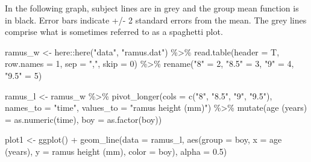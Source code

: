 \documentclass[
  9pt,
  ignorenonframetext,
]{beamer}
\newenvironment{Shaded}{\begin{snugshade}}{\end{snugshade}}
\newcommand{\AttributeTok}[1]{\textcolor[rgb]{0.77,0.63,0.00}{#1}}
\newcommand{\DecValTok}[1]{\textcolor[rgb]{0.00,0.00,0.81}{#1}}
\newcommand{\FloatTok}[1]{\textcolor[rgb]{0.00,0.00,0.81}{#1}}
\newcommand{\FunctionTok}[1]{\textcolor[rgb]{0.00,0.00,0.00}{#1}}
\newcommand{\NormalTok}[1]{#1}
\newcommand{\OtherTok}[1]{\textcolor[rgb]{0.56,0.35,0.01}{#1}}
\newcommand{\SpecialCharTok}[1]{\textcolor[rgb]{0.00,0.00,0.00}{#1}}
\newcommand{\StringTok}[1]{\textcolor[rgb]{0.31,0.60,0.02}{#1}}
\begin{document}
\begin{frame}[fragile]{}
\protect\hypertarget{section-1}{}
In the following graph, subject lines are in grey and the group mean
function is in black. Error bars indicate +/- 2 standard errors from the
mean. The grey lines comprise what is sometimes referred to as a
spaghetti plot.

\tiny

\begin{Shaded}
\begin{Highlighting}[]
\NormalTok{ramus\_w }\OtherTok{\textless{}{-}}\NormalTok{ here}\SpecialCharTok{::}\FunctionTok{here}\NormalTok{(}\StringTok{"data"}\NormalTok{, }\StringTok{"ramus.dat"}\NormalTok{) }\SpecialCharTok{\%\textgreater{}\%}
  \FunctionTok{read.table}\NormalTok{(}\AttributeTok{header =}\NormalTok{ T, }\AttributeTok{row.names =} \DecValTok{1}\NormalTok{,}
             \AttributeTok{sep =} \StringTok{","}\NormalTok{,  }\AttributeTok{skip =} \DecValTok{0}\NormalTok{) }\SpecialCharTok{\%\textgreater{}\%}
  \FunctionTok{rename}\NormalTok{(}\StringTok{"8"} \OtherTok{=} \DecValTok{2}\NormalTok{, }\StringTok{"8.5"} \OtherTok{=} \DecValTok{3}\NormalTok{, }\StringTok{"9"} \OtherTok{=} \DecValTok{4}\NormalTok{, }\StringTok{"9.5"} \OtherTok{=} \DecValTok{5}\NormalTok{) }

\NormalTok{ramus\_l }\OtherTok{\textless{}{-}}\NormalTok{ ramus\_w }\SpecialCharTok{\%\textgreater{}\%}
  \FunctionTok{pivot\_longer}\NormalTok{(}\AttributeTok{cols =} \FunctionTok{c}\NormalTok{(}\StringTok{"8"}\NormalTok{, }\StringTok{"8.5"}\NormalTok{, }\StringTok{"9"}\NormalTok{, }\StringTok{"9.5"}\NormalTok{), }
               \AttributeTok{names\_to =} \StringTok{"time"}\NormalTok{, }
               \AttributeTok{values\_to =} \StringTok{"ramus height (mm)"}\NormalTok{) }\SpecialCharTok{\%\textgreater{}\%}
  \FunctionTok{mutate}\NormalTok{(}\StringTok{\textasciigrave{}}\AttributeTok{age (years)}\StringTok{\textasciigrave{}} \OtherTok{=} \FunctionTok{as.numeric}\NormalTok{(time),}
         \AttributeTok{boy =} \FunctionTok{as.factor}\NormalTok{(boy))}

\NormalTok{plot1 }\OtherTok{\textless{}{-}} \FunctionTok{ggplot}\NormalTok{() }\SpecialCharTok{+}
  \FunctionTok{geom\_line}\NormalTok{(}\AttributeTok{data =}\NormalTok{ ramus\_l, }
            \FunctionTok{aes}\NormalTok{(}\AttributeTok{group =}\NormalTok{ boy,}
                \AttributeTok{x =} \StringTok{\textasciigrave{}}\AttributeTok{age (years)}\StringTok{\textasciigrave{}}\NormalTok{,}
                \AttributeTok{y =} \StringTok{\textasciigrave{}}\AttributeTok{ramus height (mm)}\StringTok{\textasciigrave{}}\NormalTok{,}
                \AttributeTok{color =}\NormalTok{ boy), }
            \AttributeTok{alpha =} \FloatTok{0.5}\NormalTok{) }
\end{Highlighting}
\end{Shaded}

\tiny
\end{frame}
\end{document}
